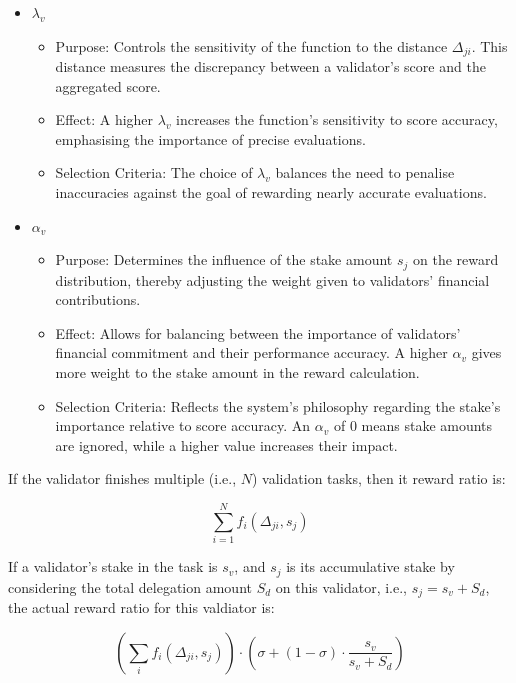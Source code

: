 \documentclass[conference]{IEEEtran}
\begin{document}
\begin{itemize}
    \item {$\lambda_v$}

\begin{itemize}
    \item Purpose: Controls the sensitivity of the function to the distance $\Delta_{ji}$. This distance measures the discrepancy between a validator's score and the aggregated score.
    \item Effect: A higher $\lambda_v$ increases the function's sensitivity to score accuracy, emphasising the importance of precise evaluations.
    
    \item Selection Criteria: The choice of $\lambda_v$ balances the need to penalise inaccuracies against the goal of rewarding nearly accurate evaluations.
\end{itemize}

\item {$\alpha_v$}
\begin{itemize}
    \item Purpose: Determines the influence of the stake amount $s_j$ on the reward distribution, thereby adjusting the weight given to validators' financial contributions.
    
    \item Effect:  Allows for balancing between the importance of validators' financial commitment and their performance accuracy. A higher $\alpha_v$ gives more weight to the stake amount in the reward calculation.
    
    \item Selection Criteria: Reflects the system's philosophy regarding the stake's importance relative to score accuracy. An $\alpha_v$ of 0 means stake amounts are ignored, while a higher value increases their impact.
\end{itemize}
\end{itemize}


If the validator finishes multiple (i.e., $N$) validation tasks, then it reward ratio is:

$$\sum_{i = 1}^{N}{f_i(\Delta_{ji}, s_j)}$$


If a validator’s stake in the task is $s_v$, and $s_j$ is its accumulative stake by considering the total delegation amount $S_d$ on this validator, i.e., $s_j = s_v + S_d$, the actual reward ratio for this valdiator is:

$$\left(\sum_i{f_i(\Delta_{ji}, s_j)}\right) \cdot \left(\sigma + (1-\sigma) \cdot \frac{s_v}{s_v+S_d}\right)$$
\end{document}
